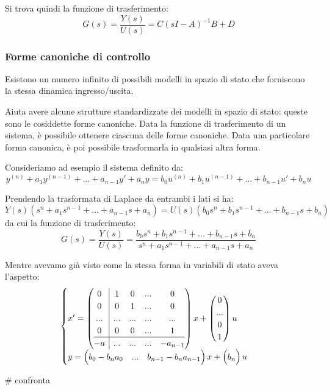 \documentclass[a4paper,11pt]{article}
\begin{document}
Si trova quindi la funzione di trasferimento:
$$
G(s) = \frac{Y(s)}{U(s)} = C(sI - A)^{-1} B + D
$$

\subsubsection{Forme canoniche di controllo}
Esistono un numero infinito di possibili modelli in spazio di stato che forniscono la stessa dinamica ingresso/uscita.

Aiuta avere alcune strutture standardizzate dei modelli in spazio di stato: queste sono le cosiddette forme canoniche.
Data la funzione di trasferimento di un sistema, è possibile ottenere ciascuna delle forme canoniche.
Data una particolare forma canonica, è poi possibile trasformarla in qualsiasi altra forma.

Consideriamo ad esempio il sistema definito da:
$$
y^{(n)} + a_1 y^{(n - 1)} + ... + a_{n - 1}y' + a_n y = b_0 u^{(n)} + b_1 u^{(n - 1)} + ... + b_{n - 1} u' + b_nu
$$

Prendendo la trasformata di Laplace da entrambi i lati si ha:
$$
Y(s) \left( s^n + a_1 s^{n - 1} + ... + a_{n - 1} s + a_n \right) = U(s) \left( b_0 s^n + b_1 s^{n - 1} + ... + b_{n - 1} s + b_n \right)
$$
da cui la funzione di trasferimento:
$$
G(s) = \frac{Y(s)}{U(s)} = \frac{ b_0 s^n + b_1 s^{n - 1} + ... + b_{n - 1} s + b_n}{s^n + a_1 s^{n - 1} + ... + a_{n - 1} s + a_n }
$$

Mentre avevamo già visto come la stessa forma in variabili di stato aveva l'aspetto:
\[
	\begin{cases}	
x' = \left(\begin{array}{@{}c | cccc@{}}
	0 & 1 & 0 & ... & 0 \\
	0 & 0 & 1 & ... & 0 \\
	... & ... & ... & ... & ... \\
	0 & 0 & 0 & ... & 1 \\
	\hline
	-a & ... & ... & ... & -a_{n - 1}
\end{array}\right)
x + \begin{pmatrix}
0 \\
... \\
0 \\
1
\end{pmatrix} u \\ 
y = \begin{pmatrix}
	b_0 - b_n a_0 & ... & b_{n - 1} - b_n a_{n - 1}	
\end{pmatrix} x + \begin{pmatrix}
b_n
\end{pmatrix} u
	\end{cases}
\]

# confronta
\end{document}
